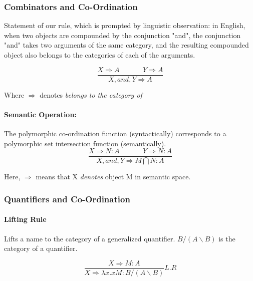\documentclass[letterpaper,12pt]{article}
\begin{document}
\subsubsection{Combinators and Co-Ordination}

Statement of our rule, which is prompted by linguistic observation: in English,
when two objects are compounded by the conjunction "and", the conjunction
"and" takes two arguments of the same category, and the resulting compounded
object also belongs to the categories of each of the arguments.

\begin{equation}
  \frac {X \Rightarrow A \hspace{40pt} Y \Rightarrow A}
  {X, and, Y \Rightarrow A}
\end{equation}

Where $\Rightarrow$ denotes \emph{belongs to the category of}

\paragraph{Semantic Operation:} The polymorphic co-ordination function
(syntactically) corresponds to a polymorphic set intersection function
(semantically).\\

\begin{equation}
  \frac {X \Rightarrow N : A \hspace{40pt} Y \Rightarrow N : A} 
  {X, and, Y \Rightarrow M \bigcap N : A}
\end{equation}

Here, $\Rightarrow$ means that X \emph{denotes} object M in semantic space. 

\subsubsection{Quantifiers and Co-Ordination}

\paragraph{Lifting Rule} Lifts a name to the category of a generalized
quantifier. $B/(A \backslash B)$ is the category of a quantifier.

\begin{equation}
  \frac {X \Rightarrow M : A}
  {X \Rightarrow \lambda x . xM : B/(A \backslash B)}
  L.R
\end{equation}
\end{document}
